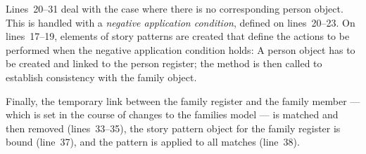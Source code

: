 Lines~20--31 deal with the case where there is no corresponding person object.
This is handled with a \emph{negative application condition}, defined on lines~20--23.
On lines~17--19, elements of story patterns are created that define the actions to be performed when the negative application condition holds: A person object has to be created and linked to the person register; the method  is then called to establish consistency with the family object.

Finally, the temporary link between the family register and the family member --- which is set in the course of changes to the families model --- is matched and then removed (lines~33--35), the story pattern object for the family register is bound (line~37), and the pattern is applied to all matches (line~38).

